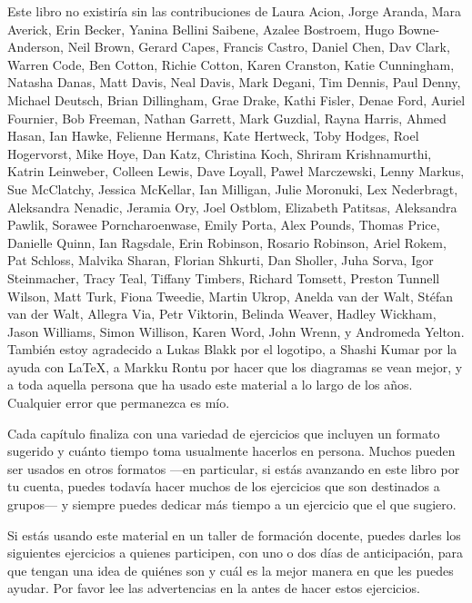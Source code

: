 
Este libro no existiría sin las contribuciones de
Laura Acion,
Jorge Aranda,
Mara Averick,
Erin Becker,
Yanina Bellini Saibene,
Azalee Bostroem,
Hugo Bowne-Anderson,
Neil Brown,
Gerard Capes,
Francis Castro,
Daniel Chen,
Dav Clark,
Warren Code,
Ben Cotton,
Richie Cotton,
Karen Cranston,
Katie Cunningham,
Natasha Danas,
Matt Davis,
Neal Davis,
Mark Degani,
Tim Dennis,
Paul Denny,
Michael Deutsch,
Brian Dillingham,
Grae Drake,
Kathi Fisler,
Denae Ford,
Auriel Fournier,
Bob Freeman,
Nathan Garrett,
Mark Guzdial,
Rayna Harris,
Ahmed Hasan,
Ian Hawke,
Felienne Hermans,
Kate Hertweck,
Toby Hodges,
Roel Hogervorst,
Mike Hoye,
Dan Katz,
Christina Koch,
Shriram Krishnamurthi,
Katrin Leinweber,
Colleen Lewis,
Dave Loyall,
Paweł Marczewski,
Lenny Markus,
Sue McClatchy,
Jessica McKellar,
Ian Milligan,
Julie Moronuki,
Lex Nederbragt,
Aleksandra Nenadic,
Jeramia Ory,
Joel Ostblom,
Elizabeth Patitsas,
Aleksandra Pawlik,
Sorawee Porncharoenwase,
Emily Porta,
Alex Pounds,
Thomas Price,
Danielle Quinn,
Ian Ragsdale,
Erin Robinson,
Rosario Robinson,
Ariel Rokem,
Pat Schloss,
Malvika Sharan,
Florian Shkurti,
Dan Sholler,
Juha Sorva,
Igor Steinmacher,
Tracy Teal,
Tiffany Timbers,
Richard Tomsett,
Preston Tunnell Wilson,
Matt Turk,
Fiona Tweedie,
Martin Ukrop,
Anelda van der Walt,
Stéfan van der Walt,
Allegra Via,
Petr Viktorin,
Belinda Weaver,
Hadley Wickham,
Jason Williams,
Simon Willison,
Karen Word,
John Wrenn,
y Andromeda Yelton.
También estoy agradecido a Lukas Blakk por el logotipo,
a Shashi Kumar por la ayuda con LaTeX,
a Markku Rontu por hacer que los diagramas se vean mejor,
y a toda aquella persona que ha usado este material a lo largo de los años.
Cualquier error que permanezca es mío. 


Cada capítulo finaliza con una variedad de ejercicios que incluyen un formato sugerido y cuánto tiempo toma usualmente hacerlos en persona.
Muchos pueden ser usados en otros formatos ---en particular,
si estás avanzando en este libro por tu cuenta,
puedes todavía hacer muchos de los ejercicios que son destinados a grupos--- y siempre
puedes dedicar más tiempo a un ejercicio que el que sugiero.

Si estás usando este material en un taller de formación docente,
puedes darles los siguientes ejercicios a quienes participen, con uno o dos días de anticipación,
para que tengan una idea de quiénes son y cuál es la mejor manera en que les puedes ayudar. 
Por favor lee las advertencias en la  antes de hacer estos ejercicios.

